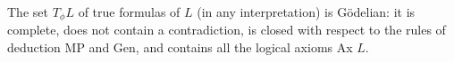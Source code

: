 The set $T_\phi L$ of true formulas of $L$ (in any interpretation) is Gödelian: it is complete, does not contain a contradiction, is closed with respect to the rules of deduction MP and Gen, and contains all the logical axioms Ax $L$.
